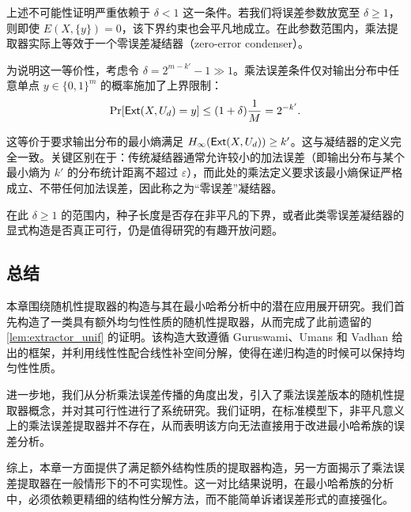 \begin{remark}
    上述不可能性证明严重依赖于 $\delta < 1$ 这一条件。若我们将误差参数放宽至 $\delta \ge 1$，则即使 $E(X, \{y\}) = 0$，该下界约束也会平凡地成立。在此参数范围内，乘法提取器实际上等效于一个零误差凝结器（zero-error condenser）。
    
    为说明这一等价性，考虑令 $\delta = 2^{m-k'} - 1 \gg 1$。乘法误差条件仅对输出分布中任意单点 $y \in \{0,1\}^m$ 的概率施加了上界限制：
    $$
    \Pr[\mathsf{Ext}(X, U_d) = y] \le (1 + \delta) \frac{1}{M} = 2^{-k'}.
    $$
    
    这等价于要求输出分布的最小熵满足 $H_\infty(\mathsf{Ext}(X, U_d)) \ge k'$。这与凝结器的定义完全一致。关键区别在于：传统凝结器通常允许较小的加法误差（即输出分布与某个最小熵为 $k'$ 的分布统计距离不超过 $\varepsilon$），而此处的乘法定义要求该最小熵保证严格成立、不带任何加法误差，因此称之为“零误差”凝结器。
    
    在此 $\delta \ge 1$ 的范围内，种子长度是否存在非平凡的下界，或者此类零误差凝结器的显式构造是否真正可行，仍是值得研究的有趣开放问题。
\end{remark}

\subsection{总结}

本章围绕随机性提取器的构造与其在最小哈希分析中的潜在应用展开研究。我们首先构造了一类具有额外均匀性性质的随机性提取器，从而完成了此前遗留的 \cref{lem:extractor_unif} 的证明。该构造大致遵循 Guruswami、Umans 和 Vadhan \cite{GUV_extractor} 给出的框架，并利用线性性配合线性补空间分解，使得在递归构造的时候可以保持均匀性性质。

进一步地，我们从分析乘法误差传播的角度出发，引入了乘法误差版本的随机性提取器概念，并对其可行性进行了系统研究。我们证明，在标准模型下，非平凡意义上的乘法误差提取器并不存在，从而表明该方向无法直接用于改进最小哈希族的误差分析。

综上，本章一方面提供了满足额外结构性质的提取器构造，另一方面揭示了乘法误差提取器在一般情形下的不可实现性。这一对比结果说明，在最小哈希族的分析中，必须依赖更精细的结构性分解方法，而不能简单诉诸误差形式的直接强化。